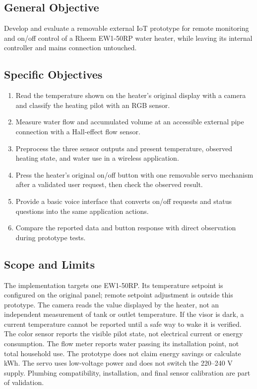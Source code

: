\subsection*{General Objective}
Develop and evaluate a removable external IoT prototype for remote monitoring and on/off control of a Rheem EW1-50RP water heater, while leaving its internal controller and mains connection untouched.

\subsection*{Specific Objectives}
\begin{enumerate}[label=SO\arabic*.]
\item Read the temperature shown on the heater's original display with a camera and classify the heating pilot with an RGB sensor.
\item Measure water flow and accumulated volume at an accessible external pipe connection with a Hall-effect flow sensor.
\item Preprocess the three sensor outputs and present temperature, observed heating state, and water use in a wireless application.
\item Press the heater's original on/off button with one removable servo mechanism after a validated user request, then check the observed result.
\item Provide a basic voice interface that converts on/off requests and status questions into the same application actions.
\item Compare the reported data and button response with direct observation during prototype tests.
\end{enumerate}

\subsection*{Scope and Limits}
The implementation targets one EW1-50RP. Its temperature setpoint is configured on the original panel; remote setpoint adjustment is outside this prototype. The camera reads the value displayed by the heater, not an independent measurement of tank or outlet temperature. If the visor is dark, a current temperature cannot be reported until a safe way to wake it is verified. The color sensor reports the visible pilot state, not electrical current or energy consumption. The flow meter reports water passing its installation point, not total household use. The prototype does not claim energy savings or calculate kWh. The servo uses low-voltage power and does not switch the 220--240 V supply. Plumbing compatibility, installation, and final sensor calibration are part of validation.
